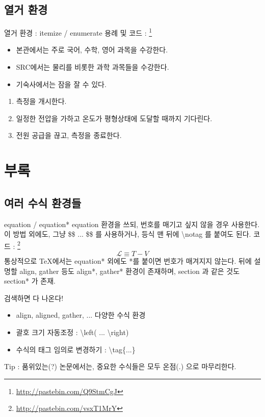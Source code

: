 \documentclass[12pt]{beamer}
\begin{document}
\subsection{열거 환경}
\begin{frame}{열거 환경 : itemize / enumerate}
	용례 및 코드 : \footnote{\url{http://pastebin.com/Q9StmCgJ}}
	\begin{itemize}
		\item 본관에서는 주로 국어, 수학, 영어 과목을 수강한다.
		\item SRC에서는 물리를 비롯한 과학 과목들을 수강한다.
		\item 기숙사에서는 잠을 잘 수 있다.
	\end{itemize}
	\begin{enumerate}
		\item 측정을 개시한다.
		\item 일정한 전압을 가하고 온도가 평형상태에 도달할 때까지 기다린다.
		\item 전원 공급을 끊고, 측정을 종료한다.
	\end{enumerate}
\end{frame}
\section{부록}
\subsection{여러 수식 환경들}
\begin{frame}{equation / equation*}
	equation 환경을 쓰되, 번호를 매기고 싶지 않을 경우 사용한다. 
	이 방법 외에도, 그냥 \$\$ ... \$\$ 를 사용하거나,
	등식 맨 뒤에 \textbackslash notag 를 붙여도 된다. 코드 : \footnote{\url{http://pastebin.com/vsxT1MrY}}
	\begin{equation*}
		\mathcal{L} \equiv T-V
	\end{equation*}
	통상적으로 \TeX 에서는 equation* 외에도 *를 붙이면 번호가 매겨지지 않는다. 뒤에 설명할 align, gather 등도 align*, gather* 환경이 존재하며, section 과 같은 것도 section* 가 존재.
\end{frame}
\begin{frame}{검색하면 다 나온다!}
	\begin{itemize}
		\item align, aligned, gather, ... 다양한 수식 환경
		\item 괄호 크기 자동조정 : \textbackslash left( ... \textbackslash right)
		\item 수식의 태그 임의로 변경하기 : \textbackslash tag\{...\}
	\end{itemize}
	Tip : 품위있는(?) 논문에서는, 중요한 수식들은 모두 온점(.) 으로 마무리한다.
\end{frame}
\end{document}
